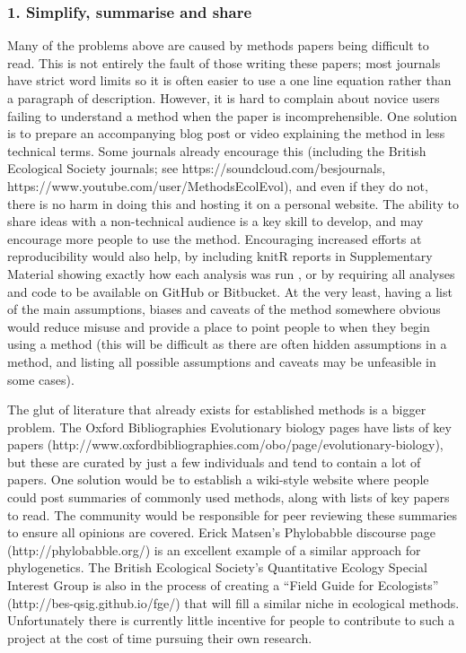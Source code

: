 \documentclass[a4paper,12pt]{article}
\begin{document}
  \subsubsection{1. Simplify, summarise and share}
    Many of the problems above are caused by methods papers being difficult to read. 
    This is not entirely the fault of those writing these papers; most journals have strict word limits so it is often easier to use a one line equation rather than a paragraph of description. 
    However, it is hard to complain about novice users failing to understand a method when the paper is incomprehensible.
    One solution is to prepare an accompanying blog post or video explaining the method in less technical terms. 
    Some journals already encourage this (including the British Ecological Society journals; see https://soundcloud.com/besjournals, https://www.youtube.com/user/MethodsEcolEvol), and even if they do not, there is no harm in doing this and hosting it on a personal website. 
    The ability to share ideas with a non-technical audience is a key skill to develop, and may encourage more people to use the method.
    Encouraging increased efforts at reproducibility would also help, by including knitR \citep{Xie:2015aa} reports in Supplementary Material showing exactly how each analysis was run \citep[e.g.][]{fitzjohn2014much}, or by requiring all analyses and code to be available on GitHub or Bitbucket. 
    At the very least, having a list of the main assumptions, biases and caveats of the method somewhere obvious would reduce misuse and provide a place to point people to when they begin using a method (this will be difficult as there are often hidden assumptions in a method, and listing all possible assumptions and caveats may be unfeasible in some cases).

    The glut of literature that already exists for established methods is a bigger problem.
    The Oxford Bibliographies Evolutionary biology pages have lists of key papers (http://www.oxfordbibliographies.com/obo/page/evolutionary-biology), but these are curated by just a few individuals and tend to contain a lot of papers. 
    One solution would be to establish a wiki-style website where people could post summaries of commonly used methods, along with lists of key papers to read. 
    The community would be responsible for peer reviewing these summaries to ensure all opinions are covered. 
    Erick Matsen's Phylobabble discourse page (http://phylobabble.org/) is an excellent example of a similar approach for phylogenetics. 
    The British Ecological Society's Quantitative Ecology Special Interest Group is also in the process of creating a ``Field Guide for Ecologists'' (http://bes-qsig.github.io/fge/) that will fill a similar niche in ecological methods.
    Unfortunately there is currently little incentive for people to contribute to such a project at the cost of time pursuing their own research.\\
\end{document}
